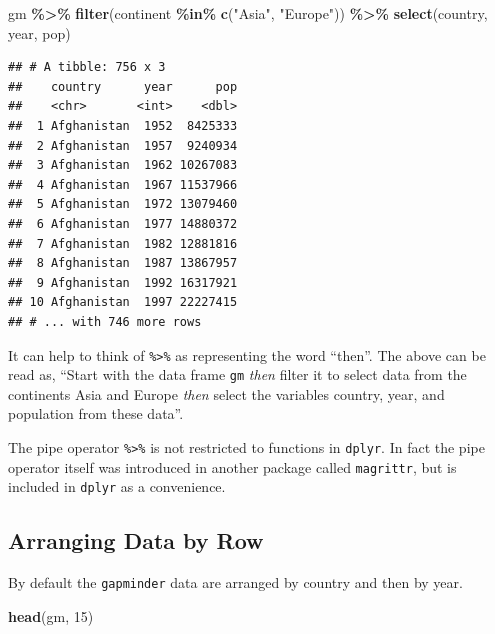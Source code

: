 \documentclass[
]{krantz}
\newenvironment{Shaded}{\begin{snugshade}}{\end{snugshade}}
\newcommand{\DecValTok}[1]{\textcolor[rgb]{0.00,0.00,0.81}{#1}}
\newcommand{\KeywordTok}[1]{\textcolor[rgb]{0.13,0.29,0.53}{\textbf{#1}}}
\newcommand{\NormalTok}[1]{#1}
\newcommand{\OperatorTok}[1]{\textcolor[rgb]{0.81,0.36,0.00}{\textbf{#1}}}
\newcommand{\StringTok}[1]{\textcolor[rgb]{0.31,0.60,0.02}{#1}}
\begin{document}
\begin{Shaded}
\begin{Highlighting}[]
\NormalTok{gm }\OperatorTok{\%\textgreater{}\%}\StringTok{ }
\StringTok{  }\KeywordTok{filter}\NormalTok{(continent }\OperatorTok{\%in\%}\StringTok{ }\KeywordTok{c}\NormalTok{(}\StringTok{"Asia"}\NormalTok{, }\StringTok{"Europe"}\NormalTok{)) }\OperatorTok{\%\textgreater{}\%}\StringTok{ }
\StringTok{  }\KeywordTok{select}\NormalTok{(country, year, pop)}
\end{Highlighting}
\end{Shaded}

\begin{verbatim}
## # A tibble: 756 x 3
##    country      year      pop
##    <chr>       <int>    <dbl>
##  1 Afghanistan  1952  8425333
##  2 Afghanistan  1957  9240934
##  3 Afghanistan  1962 10267083
##  4 Afghanistan  1967 11537966
##  5 Afghanistan  1972 13079460
##  6 Afghanistan  1977 14880372
##  7 Afghanistan  1982 12881816
##  8 Afghanistan  1987 13867957
##  9 Afghanistan  1992 16317921
## 10 Afghanistan  1997 22227415
## # ... with 746 more rows
\end{verbatim}

It can help to think of \texttt{\%\textgreater{}\%} as representing the word ``then''. The above can be read as, ``Start with the data frame \texttt{gm} \emph{then} filter it to select data from the continents Asia and Europe \emph{then} select the variables country, year, and population from these data''.

The pipe operator \texttt{\%\textgreater{}\%} is not restricted to functions in \texttt{dplyr}. In fact the pipe operator itself was introduced in another package called \texttt{magrittr}, but is included in \texttt{dplyr} as a convenience.

\hypertarget{arranging-data-by-row}{%
\subsection{Arranging Data by Row}\label{arranging-data-by-row}}

By default the \texttt{gapminder} data are arranged by country and then by year.

\begin{Shaded}
\begin{Highlighting}[]
\KeywordTok{head}\NormalTok{(gm, }\DecValTok{15}\NormalTok{)}
\end{Highlighting}
\end{Shaded}
\end{document}
